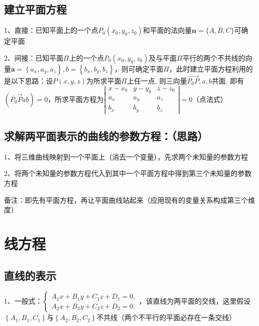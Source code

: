 \subsection{建立平面方程}

1、直接：已知平面上的一个点$P_{0}\left(x_{0}, y_{0}, z_{0}\right)$和平面的法向量$\boldsymbol{n}=\{A, B, C\}$可确定平面

2、间接：已知平面$\Pi$上的一个点$P_{0}\left(x_{0}, y_{0}, z_{0}\right)$及与平面$\Pi$平行的两个不共线的向量$\boldsymbol{a}=\left\{a_{x}\right., \left.a_{y}, a_{z}\right\}, b=\left\{b_{x}, b_{y}, b_{z}\right\}$，则可确定平面$\Pi$，此时建立平面方程利用的是以下思路：设$P(x, y, z)$为所求平面$\Pi$上任一点, 则三向量$\overrightarrow{P_{0} P}, a, b$共面, 即有$\left(\overline{P_{0}} \vec{P} a b\right)=0$，所求平面方程为$\left|\begin{array}{ccc} x-x_{0} & y-y_{0} & z-z_{0} \\ a_{x} & a_{y} & a_{z} \\ b_{x} & b_{y} & b_{z} \end{array}\right|=0$（点法式）



\subsection{求解两平面表示的曲线的参数方程：（思路）}

1、将三维曲线映射到一个平面上（消去一个变量），先求两个未知量的参数方程

2、将两个未知量的参数方程代入到其中一个平面方程中得到第三个未知量的参数方程

备注：即先有平面方程，再让平面曲线站起来（应用现有的变量关系构成第三个维度）



\section{线方程}



\subsection{直线的表示}

1、一般式：$\left\{\begin{array}{l}A_{1} x+B_{1} y+C_{1} z+D_{1}=0, \\ A_{2} x+B_{2} y+C_{2} z+D_{2}=0 .\end{array}\right.$，该直线为两平面的交线，这里假设$\left\{A_{1}, B_{1},C_{1}\right\}$与$\left\{A_{2}, B_{2}, C_{2}\right\}$不共线（两个不平行的平面必存在一条交线）

